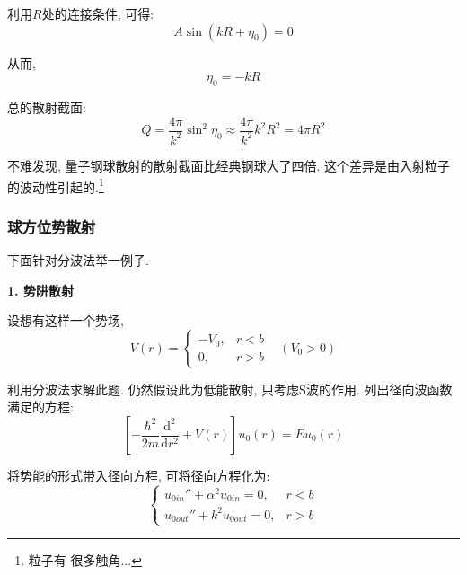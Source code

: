 \documentclass[a4paper, 11pt]{article}
\begin{document}
\begin{spacing}{1.2}
          利用$R$处的连接条件, 可得:
          \begin{equation*}
            A\sin(kR+\eta_0) = 0
          \end{equation*}

          从而, 
          \begin{equation}
            \eta_0 = -kR
          \end{equation}

          总的散射截面:
          \begin{equation}
            Q = \dfrac{4\pi}{k^2}\sin^2\eta_0 \approx \dfrac{4\pi}{k^2}k^2R^2 = 4\pi{}R^2   
          \end{equation}

          不难发现, 量子钢球散射的散射截面比经典钢球大了四倍. 这个差异是由入射粒子的波动性引起的.\footnote{粒子有
          很多触角...}
        \subsubsection{球方位势散射}

          下面针对分波法举一例子. 

          \textbf{1. 势阱散射}

          设想有这样一个势场, 
          \begin{equation}
            V(r) = \left\{
              \begin{array}{ll}
                -V_0, & r<b\\
                0, & r>b
              \end{array}\right. \;\;\; (V_0>0)
          \end{equation}

          利用分波法求解此题. 仍然假设此为低能散射, 只考虑S波的作用. 列出径向波函数满足的方程:
          \begin{equation}
            \left[-\dfrac{\hbar^2}{2m}\dfrac{\mathrm{d}^2}{\mathrm{d}r^2}+V(r)\right]u_0(r) = Eu_0(r)  
          \end{equation}

          将势能的形式带入径向方程, 可将径向方程化为:
          \begin{equation}
            \left\{\begin{array}{ll}
              u_{0in}'' + \alpha^2u_{0in} = 0, & r<b\\
              u_{0out}'' + k^2u_{0out} = 0, & r>b
            \end{array}\right.
          \end{equation}


\end{spacing}
\end{document}
